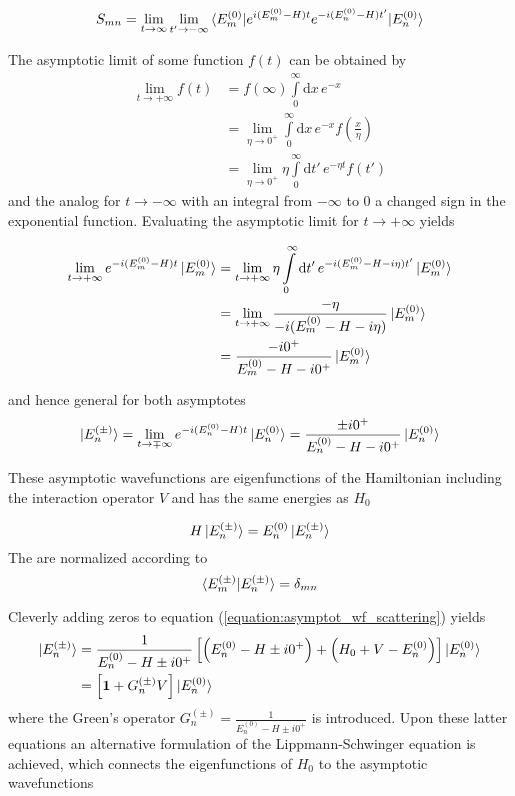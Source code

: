 \begin{equation}
 S_{mn} = \lim_{t \to \infty} \lim_{t' \to -\infty}
  \braket{E_m^{(0)}| e^{i(E_m^{(0)}-H)t} e^{-i(E_n^{(0)}-H)t'} |E_n^{(0)}}
\end{equation}

The asymptotic limit of some function $f(t)$ can be obtained by
\begin{align}
 \lim_{t \to +\infty} f(t) &= f(\infty) \int\limits_0^\infty \mathrm{d}x \, e^{-x}\\
   &= \lim_{\eta \to 0^+} \int\limits_0^\infty \mathrm{d}x \, e^{-x}
           f\left( \frac{x}{\eta}\right)    \\
   &= \lim_{\eta \to 0^+} \eta \int\limits_0^\infty \mathrm{d}t' \, e^{-\eta t} f(t')
\end{align}
and the analog for $t \rightarrow -\infty$ with an integral from $-\infty$ to $0$
a changed sign in the exponential function.
Evaluating the asymptotic limit for $t\rightarrow +\infty$ yields

\begin{align}
 \lim_{t \to +\infty} e^{-i(E_m^{(0)}-H)t} \ket{E_m^{(0)}}
 &= \lim_{t \to +\infty} \eta \int\limits_0^\infty \mathrm{d}t' \,
    e^{-i(E_m^{(0)} -H -i\eta)t'} \ket{E_m^{(0)}}\\
 &= \lim_{t \to +\infty} \frac{-\eta}{-i(E_m^{(0)}-H -i\eta)} \ket{E_m^{(0)}}\\
 &= \frac{-i0^+}{E_m^{(0)}-H -i0^+}  \ket{E_m^{(0)}}
\end{align}

and hence general for both asymptotes
\begin{equation} \label{equation:asymptot_wf_scattering}
 \ket{E_n^{(\pm)}} = \lim_{t \to \mp\infty} e^{-i(E_n^{(0)}-H)t} \ket{E_n^{(0)}}
   = \frac{\pm i0^+}{E_n^{(0)}-H -i0^+} \ket{E_n^{(0)}}
\end{equation}

These asymptotic wavefunctions are eigenfunctions of the Hamiltonian including
the interaction operator $V$ and has the same energies as $H_0$

\begin{equation}
 H \ket{E_n^{(\pm)}} = E_n^{(0)} \ket{E_n^{(\pm)}}
\end{equation}
The are normalized according to
\begin{equation}
 \braket{E_m^{(\pm)} | E_n^{(\pm)}} = \delta_{mn}
\end{equation}

Cleverly adding zeros to equation (\ref{equation:asymptot_wf_scattering})
yields
\begin{align}
 \ket{E_n^{(\pm)}} &= \frac{1}{E_n^{(0)}-H \pm i0^+}
   \left[ \left( E_n^{(0)}-H \pm i0^+ \right) + \left( H_0 + V - E_n^{(0)} \right)
        \right] \ket{E_n^{(0)}}   \\
 &= \left[ \mathbf{1} + G_n^{(\pm)}V \right]  \ket{E_n^{(0)}}
\end{align}
where the Green's operator $G_n^{(\pm)} = \frac{1}{E_n^{(0)}-H \pm i0^+}$ is
introduced. Upon these latter equations an alternative formulation
of the Lippmann-Schwinger equation is achieved, which connects the eigenfunctions
of $H_0$ to the asymptotic wavefunctions

